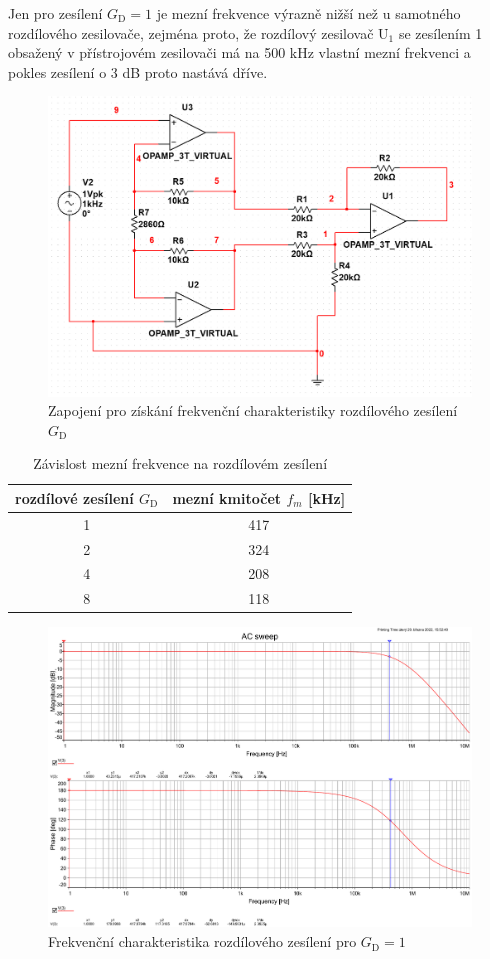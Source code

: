 \documentclass[twoside]{article}
\begin{document}
Jen pro zesílení $G_\text{D}=1$ je mezní frekvence výrazně nižší než u samotného rozdílového zesilovače,
zejména proto, že rozdílový zesilovač $\text{U}_1$ se zesílením 1 obsažený v přístrojovém zesilovači má na 500 \si{\kilo\hertz}
vlastní mezní frekvenci a pokles zesílení o 3 \si{\deci\bel} proto nastává dříve.

\begin{figure}[h!]
    \centering
    \includegraphics[width=0.8\linewidth]{bode_diff_schema.png}
    \caption{Zapojení pro získání frekvenční charakteristiky rozdílového zesílení $G_\text{D}$}
    \label{fig:schema_diff_bode}
\end{figure}

\begin{table}[h!]
    \centering
    \begin{tabular}{c|c}
        rozdílové zesílení $G_\text{D}$ & mezní kmitočet $f_m$ [\si{\kilo\hertz}] \\
        \hline
        1 & 417 \\
        2 & 324 \\
        4 & 208 \\
        8 & 118 
    \end{tabular}
    \caption{Závislost mezní frekvence na rozdílovém zesílení}
    \label{tab:mezni_f}
\end{table}

\begin{figure}[h!]
    \centering
    \includegraphics[width=0.92\linewidth]{bode_diff_1.pdf}
    \caption{Frekvenční charakteristika rozdílového zesílení pro $G_\text{D} = 1$}
    \label{fig:bode_diff_1}
\end{figure}
\end{document}
